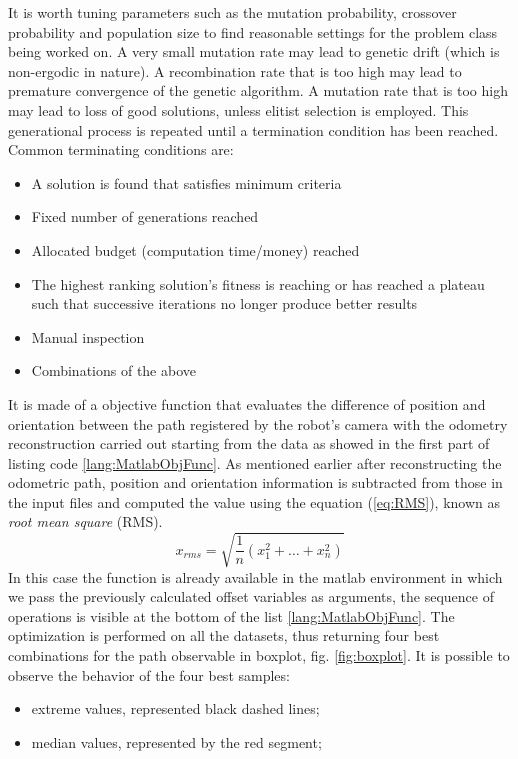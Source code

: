 It is worth tuning parameters such as the mutation probability, crossover probability and population size to find reasonable settings for the problem class being worked on. A very small mutation rate may lead to genetic drift (which is non-ergodic in nature). A recombination rate that is too high may lead to premature convergence of the genetic algorithm. A mutation rate that is too high may lead to loss of good solutions, unless elitist selection is employed.
This generational process is repeated until a termination condition has been reached. Common terminating conditions are:
\begin{itemize}
\item A solution is found that satisfies minimum criteria
\item Fixed number of generations reached
\item Allocated budget (computation time/money) reached
\item The highest ranking solution's fitness is reaching or has reached a plateau such that successive iterations no longer produce better results
\item Manual inspection
\item Combinations of the above
\end{itemize}
\noindent It is made of a objective function that evaluates the difference of position and orientation between the path registered by the robot's camera with the odometry reconstruction carried out starting from the data as showed in the first part of listing code \ref{lang:MatlabObjFunc}. 
As mentioned earlier after reconstructing the odometric path, position and orientation information is subtracted from those in the input files and computed the value using the equation (\ref{eq:RMS}), known as \emph{root mean square} (RMS). 
\begin{equation}
x_{rms} = \sqrt{\frac{1}{n}(x_1^2 + \dots + x_n^2)}
\label{eq:RMS}
\end{equation}
In this case the function is already available in the matlab environment in which we pass the previously calculated offset variables as arguments, the sequence of operations is visible at the bottom of the list \ref{lang:MatlabObjFunc}.
The optimization is performed on all the datasets, thus returning four best combinations for the path observable in boxplot, fig. \ref{fig:boxplot}. It is possible to observe the behavior of the four best samples:
\begin{itemize}
\item extreme values, represented black dashed lines;
\item median values, represented by the red segment;
\end{itemize}
